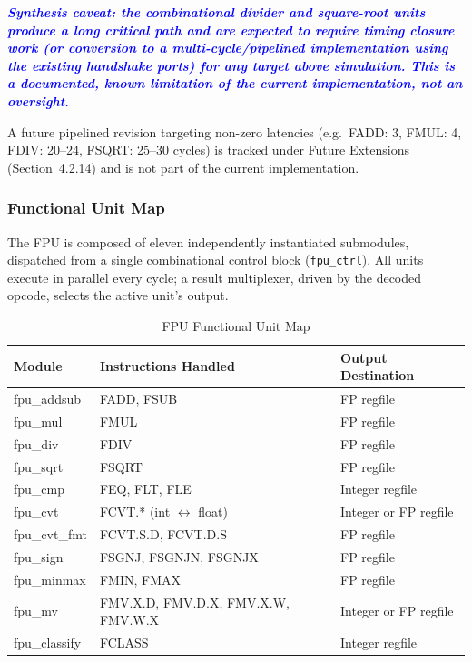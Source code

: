 \textcolor{blue}{\textbf{\textit{Synthesis caveat: the combinational divider
and square-root units produce a long critical path and are expected to
require timing closure work (or conversion to a multi-cycle/pipelined
implementation using the existing handshake ports) for any target above
simulation. This is a documented, known limitation of the current
implementation, not an oversight.}}}

A future pipelined revision targeting non-zero latencies (e.g.\ FADD: 3,
FMUL: 4, FDIV: 20--24, FSQRT: 25--30 cycles) is tracked under Future
Extensions (Section~4.2.14) and is not part of the current implementation.

\subsubsection{Functional Unit Map}
The FPU is composed of eleven independently instantiated submodules,
dispatched from a single combinational control block (\texttt{fpu\_ctrl}).
All units execute in parallel every cycle; a result multiplexer, driven by
the decoded opcode, selects the active unit's output.

\begin{table}[H]
\centering
\caption{FPU Functional Unit Map}
\begin{tabular}{|l|l|l|}
\hline
\textbf{Module} & \textbf{Instructions Handled} & \textbf{Output Destination} \\ \hline
fpu\_addsub  & FADD, FSUB                          & FP regfile \\ \hline
fpu\_mul     & FMUL                                & FP regfile \\ \hline
fpu\_div     & FDIV                                & FP regfile \\ \hline
fpu\_sqrt    & FSQRT                               & FP regfile \\ \hline
fpu\_cmp     & FEQ, FLT, FLE                       & Integer regfile \\ \hline
fpu\_cvt     & FCVT.* (int $\leftrightarrow$ float) & Integer or FP regfile \\ \hline
fpu\_cvt\_fmt& FCVT.S.D, FCVT.D.S                  & FP regfile \\ \hline
fpu\_sign    & FSGNJ, FSGNJN, FSGNJX               & FP regfile \\ \hline
fpu\_minmax  & FMIN, FMAX                          & FP regfile \\ \hline
fpu\_mv      & FMV.X.D, FMV.D.X, FMV.X.W, FMV.W.X  & Integer or FP regfile \\ \hline
fpu\_classify& FCLASS                              & Integer regfile \\ \hline
\end{tabular}
\end{table}

